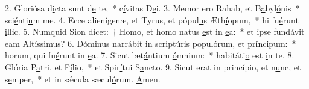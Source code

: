 2. Gloriósa d\uline{i}cta sunt d\uline{e} te,~* c\uline{í}vitas D\uline{e}i.
3. Memor ero Rahab, et B\uline{a}byl\uline{ó}nis~* sci\uline{é}nti\uline{u}m me.
4. Ecce alienígenæ, et Tyrus, et pópul\uline{u}s Æth\uline{í}opum,~* hi fu\uline{é}runt \uline{i}llic.
5. Numquid Sion dicet:~† Homo, et homo natus \uline{e}st in \uline{e}a:~* et ipse fundávit \uline{e}am Alt\uline{í}ssimus?
6. Dóminus narrábit in scriptúris popul\uline{ó}rum, et pr\uline{í}ncipum:~* horum, qui fu\uline{é}runt in \uline{e}a.
7. Sicut læt\uline{á}ntium \uline{ó}mnium:~* habitáti\uline{o} est \uline{i}n te.
8. Glória P\uline{a}tri, et F\uline{í}lio,~* et Spir\uline{í}tui S\uline{a}ncto.
9. Sicut erat in princípio, et n\uline{u}nc, et s\uline{e}mper,~* et in sǽcula sæcul\uline{ó}rum. \uline{A}men.
